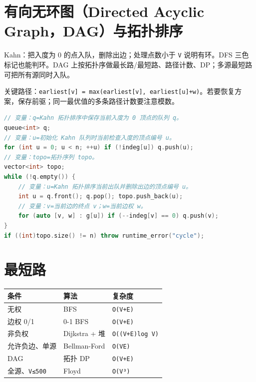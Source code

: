 \section{有向无环图（Directed Acyclic Graph，DAG）与拓扑排序}\label{ux6709ux5411ux65e0ux73afux56fedirected-acyclic-graphdagux4e0eux62d3ux6251ux6392ux5e8f}

Kahn：把入度为 0 的点入队，删除出边；处理点数小于 \passthrough{\lstinline!V!} 说明有环。DFS 三色标记也能判环。DAG 上按拓扑序做最长路/最短路、路径计数、DP；多源最短路可把所有源同时入队。

关键路径：\passthrough{\lstinline!earliest[v] = max(earliest[v], earliest[u]+w)!}。若要恢复方案，保存前驱；同一最优值的多条路径计数要注意模数。

\begin{lstlisting}[language={C++}]
// 变量：q=Kahn 拓扑排序中保存当前入度为 0 顶点的队列 q。
queue<int> q;
// 变量：u=初始化 Kahn 队列时当前检查入度的顶点编号 u。
for (int u = 0; u < n; ++u) if (!indeg[u]) q.push(u);
// 变量：topo=拓扑序列 topo。
vector<int> topo;
while (!q.empty()) {
    // 变量：u=Kahn 拓扑排序当前出队并删除出边的顶点编号 u。
    int u = q.front(); q.pop(); topo.push_back(u);
    // 变量：v=当前边的终点 v；w=当前边权 w。
    for (auto [v, w] : g[u]) if (--indeg[v] == 0) q.push(v);
}
if ((int)topo.size() != n) throw runtime_error("cycle");
\end{lstlisting}

\section{最短路}\label{ux6700ux77edux8def}

\begin{longtable}[]{@{}lll@{}}
\toprule\noalign{}
条件 & 算法 & 复杂度 \\
\midrule\noalign{}
\endhead
\bottomrule\noalign{}
\endlastfoot
无权 & BFS & \passthrough{\lstinline!O(V+E)!} \\
边权 0/1 & 0-1 BFS & \passthrough{\lstinline!O(V+E)!} \\
非负权 & Dijkstra + 堆 & \passthrough{\lstinline!O((V+E)log V)!} \\
允许负边、单源 & Bellman-Ford & \passthrough{\lstinline!O(VE)!} \\
DAG & 拓扑 DP & \passthrough{\lstinline!O(V+E)!} \\
全源、\passthrough{\lstinline!V≤500!} & Floyd & \passthrough{\lstinline!O(V³)!} \\
\end{longtable}


